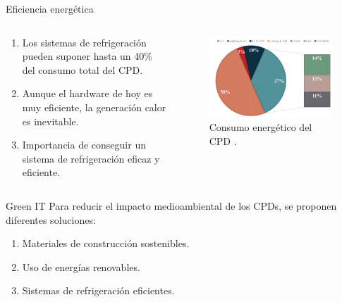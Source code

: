 \documentclass[aspectratio=169, compress]{beamer}
\begin{document}
\begin{frame}{Eficiencia energética}
    \begin{columns}
        \begin{column}{0.5\textwidth}
            \begin{enumerate}
                \item Los sistemas de refrigeración pueden suponer hasta un 40\% del consumo total del CPD. 
                \item Aunque el hardware de hoy es muy eficiente, la generación calor es inevitable. 
                \item Importancia de conseguir un sistema de refrigeración eficaz y eficiente. 
            \end{enumerate}        
        \end{column}
        \begin{column}{0.5\textwidth}  
            \begin{figure}
                \begin{center}
                    \includegraphics[scale=0.5]{../figures/consumo}
                    \caption{Consumo energético del CPD \cite{ZHANG2021102253}.}
                    \label{consumo_energetico}
                \end{center}
            \end{figure}        
        \end{column}
    \end{columns}    
\end{frame}

\begin{frame}{Green IT}
    Para reducir el impacto medioambiental de los CPDs, se proponen diferentes soluciones:

    \begin{enumerate}
        \item Materiales de construcción sostenibles.
        \item Uso de energías renovables.
        \item Sistemas de refrigeración eficientes.
    \end{enumerate}


\end{frame}
\end{document}
